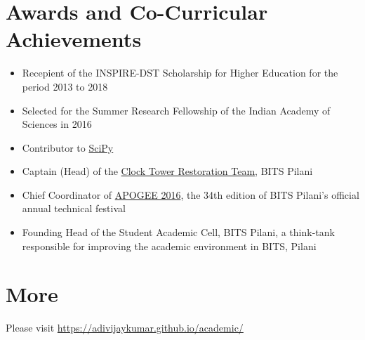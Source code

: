 \documentclass[margin, centered]{res}
\begin{document}
\begin{resume}
\section{Awards and Co-Curricular Achievements}
\begin{itemize}[leftmargin=*]
 \item Recepient of the INSPIRE-DST Scholarship for Higher Education for the period 2013 to 2018
 \item Selected for the Summer Research Fellowship of the Indian Academy of Sciences in 2016
 \item Contributor to \href{https://www.scipy.org/}{SciPy}
 \item Captain (Head) of the \href{http://www.bits-clocktower.org/}{Clock Tower Restoration Team}, BITS Pilani
 \item Chief Coordinator of \href{https://bits-apogee.org/2016/}{APOGEE 2016}, the 34th edition of BITS Pilani's official annual technical festival
 \item Founding Head of the Student Academic Cell, BITS Pilani, a think-tank responsible for improving the academic environment in BITS, Pilani
\end{itemize}



\section{More}
Please visit \href{https://adivijaykumar.github.io/academic/}{https://adivijaykumar.github.io/academic/}

\end{resume}
\end{document}
